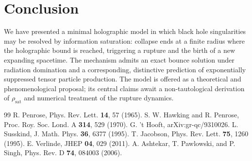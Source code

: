 \documentclass[onecolumn,PRD,amsmath,amssymb,aps,nofootinbib,superscriptaddress,11pt]{revtex4-2}
\begin{document}
\section{Conclusion}
We have presented a minimal holographic model in which black hole singularities may be resolved by information saturation: collapse ends at a finite radius where the holographic bound is reached, triggering a rupture and the birth of a new expanding spacetime. The mechanism admits an exact bounce solution under radiation domination and a corresponding, distinctive prediction of exponentially suppressed tensor particle production. The model is offered as a theoretical and phenomenological proposal; its central claims await a non-tautological derivation of $\rho_{\text{sat}}$ and numerical treatment of the rupture dynamics.

\begin{thebibliography}{99}
 R. Penrose, Phys. Rev. Lett. \textbf{14}, 57 (1965).
 S. W. Hawking and R. Penrose, Proc. Roy. Soc. Lond. A \textbf{314}, 529 (1970).
 G. 't Hooft, arXiv:gr-qc/9310026.
 L. Susskind, J. Math. Phys. \textbf{36}, 6377 (1995).
 T. Jacobson, Phys. Rev. Lett. \textbf{75}, 1260 (1995).
 E. Verlinde, JHEP \textbf{04}, 029 (2011).
 A. Ashtekar, T. Pawlowski, and P. Singh, Phys. Rev. D \textbf{74}, 084003 (2006).
\end{thebibliography}
\end{document}
